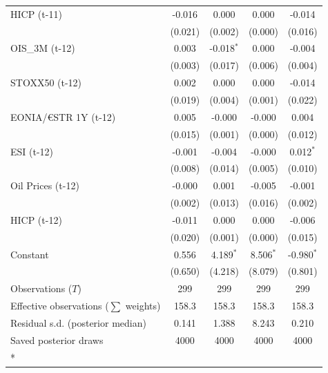 \begin{longtable}[t]{lcccc}
HICP (t-11) & -0.016 & 0.000 & 0.000 & -0.014\\
 & (0.021) & (0.002) & (0.000) & (0.016)\\
OIS\_3M (t-12) & 0.003 & -0.018$^{*}$ & 0.000 & -0.004\\
 & (0.003) & (0.017) & (0.006) & (0.004)\\
STOXX50 (t-12) & 0.002 & 0.000 & 0.000 & -0.014\\
 & (0.019) & (0.004) & (0.001) & (0.022)\\
EONIA/€STR 1Y (t-12) & 0.005 & -0.000 & -0.000 & 0.004\\
 & (0.015) & (0.001) & (0.000) & (0.012)\\
ESI (t-12) & -0.001 & -0.004 & -0.000 & 0.012$^{*}$\\
 & (0.008) & (0.014) & (0.005) & (0.010)\\
Oil Prices (t-12) & -0.000 & 0.001 & -0.005 & -0.001\\
 & (0.002) & (0.013) & (0.016) & (0.002)\\
HICP (t-12) & -0.011 & 0.000 & 0.000 & -0.006\\
 & (0.020) & (0.001) & (0.000) & (0.015)\\
Constant & 0.556 & 4.189$^{*}$ & 8.506$^{*}$ & -0.980$^{*}$\\
 & (0.650) & (4.218) & (8.079) & (0.801)\\
\midrule
Observations ($T$) & 299 & 299 & 299 & 299\\
Effective observations ($\sum$ weights) & 158.3 & 158.3 & 158.3 & 158.3\\
Residual s.d. (posterior median) & 0.141 & 1.388 & 8.243 & 0.210\\
Saved posterior draws & 4000 & 4000 & 4000 & 4000\\*
\end{longtable}
\endgroup{}

